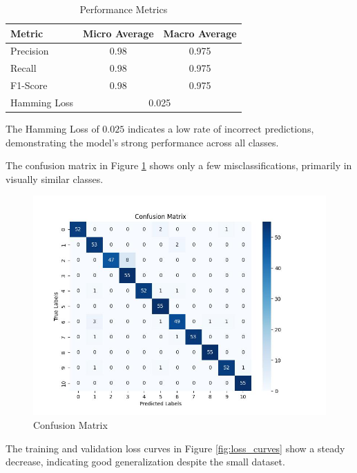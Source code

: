 \documentclass[conference]{IEEEtran}
\begin{document}
\begin{table}[h]
\centering
\caption{Performance Metrics}
\label{tab:metrics}
\begin{tabular}{|l|c|c|}
\hline
Metric & Micro Average & Macro Average \\ \hline
Precision & 0.98 & 0.975 \\ \hline
Recall & 0.98 & 0.975 \\ \hline
F1-Score & 0.98 & 0.975 \\ \hline
Hamming Loss & \multicolumn{2}{c|}{0.025} \\ \hline
\end{tabular}
\end{table}

The Hamming Loss of $0.025$ indicates a low rate of incorrect predictions, demonstrating the model's strong performance across all classes.

The confusion matrix in Figure \ref{fig:confusion_matrix} shows only a few misclassifications, primarily in visually similar classes.

\begin{figure}[h]
\centering
\includegraphics[width=1\linewidth]{confusion_matrix.jpg}
\caption{Confusion Matrix}
\label{fig:confusion_matrix}
\end{figure}

The training and validation loss curves in Figure \ref{fig:loss_curves} show a steady decrease, indicating good generalization despite the small dataset.
\end{document}
